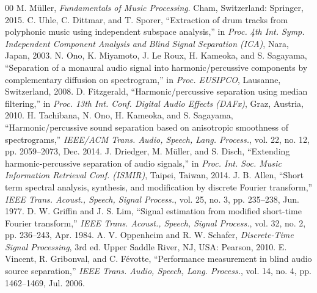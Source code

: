 \documentclass[conference]{IEEEtran}
\begin{document}
\begin{thebibliography}{00}
 M. M\"uller, \emph{Fundamentals of Music Processing}. Cham, Switzerland: Springer, 2015.
 C. Uhle, C. Dittmar, and T. Sporer, ``Extraction of drum tracks from polyphonic music using independent subspace analysis,'' in \emph{Proc. 4th Int. Symp. Independent Component Analysis and Blind Signal Separation (ICA)}, Nara, Japan, 2003.
 N. Ono, K. Miyamoto, J. Le Roux, H. Kameoka, and S. Sagayama, ``Separation of a monaural audio signal into harmonic/percussive components by complementary diffusion on spectrogram,'' in \emph{Proc. EUSIPCO}, Lausanne, Switzerland, 2008.
 D. Fitzgerald, ``Harmonic/percussive separation using median filtering,'' in \emph{Proc. 13th Int. Conf. Digital Audio Effects (DAFx)}, Graz, Austria, 2010.
 H. Tachibana, N. Ono, H. Kameoka, and S. Sagayama, ``Harmonic/percussive sound separation based on anisotropic smoothness of spectrograms,'' \emph{IEEE/ACM Trans. Audio, Speech, Lang. Process.}, vol. 22, no. 12, pp. 2059--2073, Dec. 2014.
 J. Driedger, M. M\"uller, and S. Disch, ``Extending harmonic-percussive separation of audio signals,'' in \emph{Proc. Int. Soc. Music Information Retrieval Conf. (ISMIR)}, Taipei, Taiwan, 2014.
 J. B. Allen, ``Short term spectral analysis, synthesis, and modification by discrete Fourier transform,'' \emph{IEEE Trans. Acoust., Speech, Signal Process.}, vol. 25, no. 3, pp. 235--238, Jun. 1977.
 D. W. Griffin and J. S. Lim, ``Signal estimation from modified short-time Fourier transform,'' \emph{IEEE Trans. Acoust., Speech, Signal Process.}, vol. 32, no. 2, pp. 236--243, Apr. 1984.
 A. V. Oppenheim and R. W. Schafer, \emph{Discrete-Time Signal Processing}, 3rd ed. Upper Saddle River, NJ, USA: Pearson, 2010.
 E. Vincent, R. Gribonval, and C. F\'evotte, ``Performance measurement in blind audio source separation,'' \emph{IEEE Trans. Audio, Speech, Lang. Process.}, vol. 14, no. 4, pp. 1462--1469, Jul. 2006.
\end{thebibliography}
\end{document}
